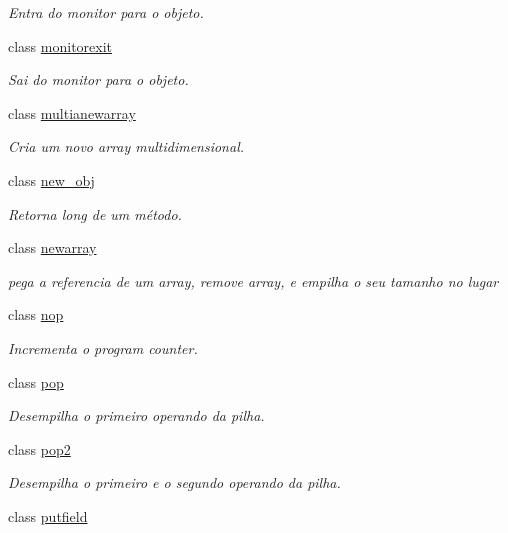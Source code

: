 \begin{DoxyCompactItemize}
\begin{DoxyCompactList}\small\item\em Entra do monitor para o objeto. \end{DoxyCompactList}\item 
class \hyperlink{class_instruction_impl_1_1monitorexit}{monitorexit}
\begin{DoxyCompactList}\small\item\em Sai do monitor para o objeto. \end{DoxyCompactList}\item 
class \hyperlink{class_instruction_impl_1_1multianewarray}{multianewarray}
\begin{DoxyCompactList}\small\item\em Cria um novo array multidimensional. \end{DoxyCompactList}\item 
class \hyperlink{class_instruction_impl_1_1new__obj}{new\+\_\+obj}
\begin{DoxyCompactList}\small\item\em Retorna long de um método. \end{DoxyCompactList}\item 
class \hyperlink{class_instruction_impl_1_1newarray}{newarray}
\begin{DoxyCompactList}\small\item\em pega a referencia de um array, remove array, e empilha o seu tamanho no lugar \end{DoxyCompactList}\item 
class \hyperlink{class_instruction_impl_1_1nop}{nop}
\begin{DoxyCompactList}\small\item\em Incrementa o program counter. \end{DoxyCompactList}\item 
class \hyperlink{class_instruction_impl_1_1pop}{pop}
\begin{DoxyCompactList}\small\item\em Desempilha o primeiro operando da pilha. \end{DoxyCompactList}\item 
class \hyperlink{class_instruction_impl_1_1pop2}{pop2}
\begin{DoxyCompactList}\small\item\em Desempilha o primeiro e o segundo operando da pilha. \end{DoxyCompactList}\item 
class \hyperlink{class_instruction_impl_1_1putfield}{putfield}

\end{DoxyCompactItemize}
